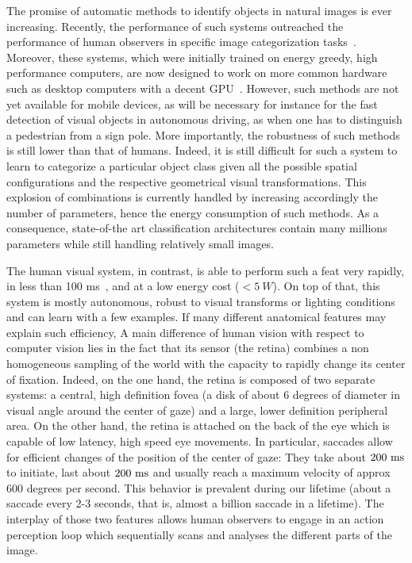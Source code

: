 The promise of automatic methods to identify objects in natural images is ever increasing. Recently, the performance of such systems outreached the performance of human observers in specific image categorization tasks\CNS~\citep{He15}\fi. \CNS Moreover, these systems, which were initially trained on energy greedy, high performance computers, are now designed to work on more common hardware such as desktop computers with a decent GPU~\citep{Sandler18}.
However, such methods are not yet available for mobile devices, as will be necessary for instance for the fast detection of visual objects in autonomous driving, as when one has to distinguish a pedestrian from a sign pole. More importantly, the robustness of such methods is still lower than that of humans. Indeed, it is still difficult for such a system to learn to categorize a particular object class given all the possible spatial configurations and the respective geometrical visual transformations. This explosion of combinations is currently handled by increasing accordingly the number of parameters, hence the energy consumption of such methods. As a consequence, state-of-the art classification architectures contain many millions parameters while still handling relatively small images.

The human visual system, in contrast, is able to perform such a feat very rapidly, in less than 100 ms~\citep{Kirchner06}, and at a low energy cost ($<5~W$). On top of that, this system is mostly autonomous, robust to visual transforms or lighting conditions and can learn with a few examples. If many different anatomical features may explain such efficiency, \fi A main difference of human vision with respect to computer vision lies in the fact that its sensor (the retina) combines a non homogeneous sampling of the world with the capacity to rapidly change its center of fixation. Indeed, on the one hand, the retina is composed of two separate systems: a central, high definition fovea (a disk of about 6 degrees of diameter in visual angle around the center of gaze) and a large, lower definition peripheral area. On the other hand, the retina is attached on the back of the eye which is capable of low latency, high speed eye movements. \CNS In particular, saccades allow for efficient changes of the position of the center of gaze: They take about $200~\si{\milli\second}$ to initiate, last about $200~\si{\milli\second}$ and usually reach a maximum velocity of approx 600 degrees per second. This behavior is prevalent during our lifetime (about a saccade every 2-3 seconds, that is, almost a billion saccade in a lifetime). \fi The interplay of those two features allows human observers to engage in an action perception loop which sequentially scans and analyses the different parts of the image.

